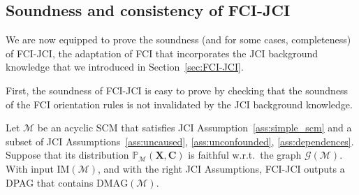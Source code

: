 \documentclass[twoside,11pt]{article}
\newcommand{\Prb}{\mathbb{P}}
\newcommand\B[1]{\bm{#1}}
\newcommand\C[1]{\mathcal{#1}}
\newcommand{\DMAG}{\mathrm{DMAG}}
\newcommand{\IM}{\mathrm{IM}}
\newcommand{\JCIABC}{\ref{ass:uncaused}, \ref{ass:unconfounded}, \ref{ass:dependences}}
\begin{document}
\subsection{Soundness and consistency of FCI-JCI}\label{sec:app:fcijci_sound}

We are now equipped to prove the soundness (and for some cases, completeness) of FCI-JCI, the adaptation of FCI that 
incorporates the JCI background knowledge that we introduced in Section~\ref{sec:FCI-JCI}.

First, the soundness of FCI-JCI is easy to prove by checking that the soundness of the FCI orientation rules is not invalidated by the JCI background knowledge.
\begin{theorem}\label{theo:fcijci_sound}
  Let $\C{M}$ be an acyclic SCM that satisfies JCI Assumption~\ref{ass:simple_scm} and a subset of JCI Assumptions~\JCIABC. 
  Suppose that its distribution $\Prb_{\C{M}}(\B{X},\B{C})$ is faithful w.r.t.\ the graph $\C{G}(\C{M})$. 
  With input $\IM(\C{M})$, and with the right JCI Assumptions, FCI-JCI outputs a DPAG that contains $\DMAG(\C{M})$.
\end{theorem}
\end{document}

